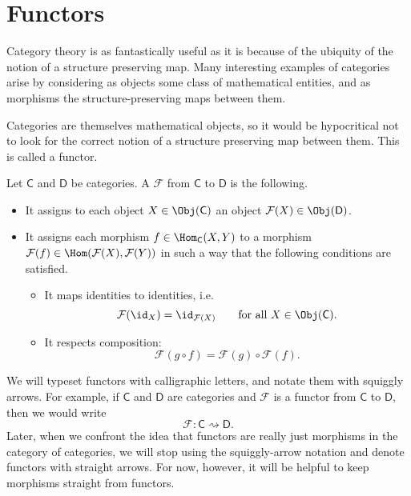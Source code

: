 \documentclass[main.tex]{subfiles}
\begin{document}
\section{Functors}\label{sec:functors}

Category theory is as fantastically useful as it is because of the ubiquity of the notion of a structure preserving map. Many interesting examples of categories arise by considering as objects some class of mathematical entities, and as morphisms the structure-preserving maps between them.

Categories are themselves mathematical objects, so it would be hypocritical not to look for the correct notion of a structure preserving map between them. This is called a functor.

\begin{definition}[functor]
  \label{def:functor}
  Let $\mathsf{C}$ and $\mathsf{D}$ be categories. A  $\mathcal{F}$ from $\mathsf{C}$ to $\mathsf{D}$ is the following.
  \begin{itemize}
    \item It assigns to each object $X \in \Obj(\mathsf{C})$ an object $\mathcal{F}(X) \in \Obj(\mathsf{D})$.

    \item It assigns each morphism $f \in \Hom_{\mathsf{C}}(X, Y)$ to a morphism $\mathcal{F}(f) \in \Hom(\mathcal{F}(X), \mathcal{F}(Y))$ in such a way that the following conditions are satisfied.
      \begin{itemize}
        \item It maps identities to identities, i.e.\
          \begin{equation*}
            \mathcal{F}(\id_{X}) = \id_{\mathcal{F}(X)}\qquad \text{for all } X \in \Obj(\mathsf{C}).
          \end{equation*}
        \item It respects composition:
          \begin{equation*}
            \mathcal{F}(g \circ f) = \mathcal{F}(g) \circ \mathcal{F}(f).
          \end{equation*}
      \end{itemize}
  \end{itemize}
\end{definition}

\begin{notation}
  We will typeset functors with calligraphic letters, and notate them with squiggly arrows. For example, if $\mathsf{C}$ and $\mathsf{D}$ are categories and $\mathcal{F}$ is a functor from $\mathsf{C}$ to $\mathsf{D}$, then we would write
  \begin{equation*}
    \mathcal{F}\colon \mathsf{C} \rightsquigarrow \mathsf{D}.
  \end{equation*}
  Later, when we confront the idea that functors are really just morphisms in the category of categories, we will stop using the squiggly-arrow notation and denote functors with straight arrows. For now, however, it will be helpful to keep morphisms straight from functors.
\end{notation}
\end{document}
